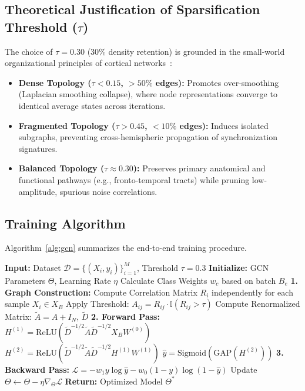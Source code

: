 \documentclass[journal]{IEEEtran}
\begin{document}
\subsection{Theoretical Justification of Sparsification Threshold ($\tau$)}
The choice of $\tau = 0.30$ ($30\%$ density retention) is grounded in the small-world organizational principles of cortical networks~\cite{bassett, bullmore}:
\begin{itemize}
    \item \textbf{Dense Topology ($\tau < 0.15$, $>50\%$ edges):} Promotes over-smoothing (Laplacian smoothing collapse), where node representations converge to identical average states across iterations.
    \item \textbf{Fragmented Topology ($\tau > 0.45$, $<10\%$ edges):} Induces isolated subgraphs, preventing cross-hemispheric propagation of synchronization signatures.
    \item \textbf{Balanced Topology ($\tau \approx 0.30$):} Preserves primary anatomical and functional pathways (e.g., fronto-temporal tracts) while pruning low-amplitude, spurious noise correlations.
\end{itemize}

\subsection{Training Algorithm}
Algorithm~\ref{alg:gcn} summarizes the end-to-end training procedure.

\begin{algorithm}[!ht]
\small
\caption{Spatial-GCN Training Loop}\label{alg:gcn}
\begin{algorithmic}[1]
\State \textbf{Input:} Dataset $\mathcal{D} = \{(X_i, y_i)\}_{i=1}^M$, Threshold $\tau=0.3$
\State \textbf{Initialize:} GCN Parameters $\Theta$, Learning Rate $\eta$
    \State Calculate Class Weights $w_c$ based on batch $B_e$
        \State \textbf{1. Graph Construction:}
        \State \quad Compute Correlation Matrix $R_i$ independently for each sample $X_i \in X_B$
        \State \quad Apply Threshold: $A_{ij} = R_{ij} \cdot \mathbb{I}(R_{ij} > \tau)$
        \State \quad Compute Renormalized Matrix: $\tilde{A} = A + I_N$, $\tilde{D}$
        \State \textbf{2. Forward Pass:}
        \State \quad $H^{(1)} = \text{ReLU}(\tilde{D}^{-1/2} \tilde{A} \tilde{D}^{-1/2} X_B W^{(0)})$
        \State \quad $H^{(2)} = \text{ReLU}(\tilde{D}^{-1/2} \tilde{A} \tilde{D}^{-1/2} H^{(1)} W^{(1)})$
        \State \quad $\hat{y} = \text{Sigmoid}(\text{GAP}(H^{(2)}))$
        \State \textbf{3. Backward Pass:}
        \State \quad $\mathcal{L} = - w_{1} y \log \hat{y} - w_{0} (1-y)\log(1-\hat{y})$
        \State \quad Update $\Theta \leftarrow \Theta - \eta \nabla_\Theta \mathcal{L}$
    \EndFor
\EndFor
\State \textbf{Return:} Optimized Model $\Theta^*$
\end{algorithmic}
\end{algorithm}
\end{document}
